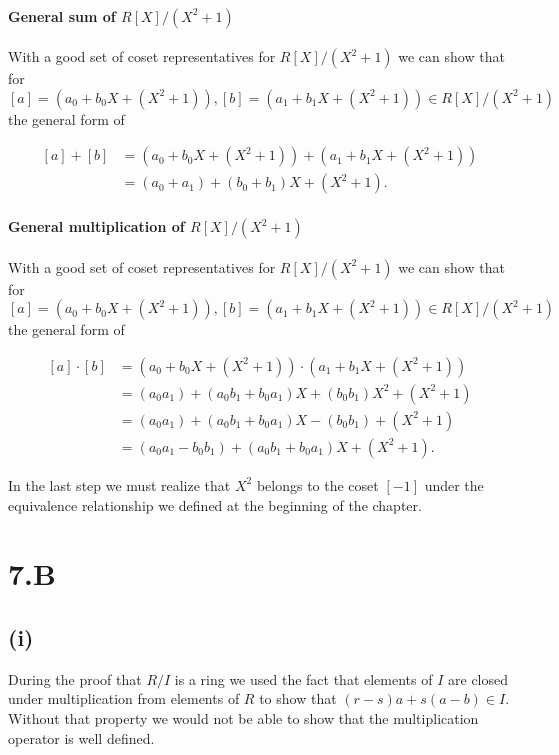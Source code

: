 \documentclass{article}
\begin{document}
    \paragraph{General sum of $R[X]/(X^2 + 1)$} With a good set of coset representatives for $R[X]/(X^2 + 1)$ we can show that for $[a] = (a_0 + b_0X + (X^2 + 1)),  [b] = (a_1 + b_1X + (X^2 + 1)) \in R[X]/(X^2 + 1)$ the general form of 

    \[
        \begin{split}
          [a] + [b] &= (a_0 + b_0X + (X^2 + 1)) +  (a_1 + b_1X + (X^2 + 1))\\
          &= (a_0+a_1) + (b_0 + b_1)X + (X^2 + 1).
        \end{split}
    \]


    \paragraph{General multiplication of $R[X]/(X^2 + 1)$} With a good set of coset representatives for $R[X]/(X^2 + 1)$ we can show that for $[a] = (a_0 + b_0X + (X^2 + 1)),  [b] = (a_1 + b_1X + (X^2 + 1)) \in R[X]/(X^2 + 1)$ the general form of 

    \[
        \begin{split}
          [a] \cdot [b] &= (a_0 + b_0X + (X^2 + 1)) \cdot  (a_1 + b_1X + (X^2 + 1))\\
          &= (a_0a_1) + (a_0b_1 + b_0a_1)X + (b_0b_1)X^2 + (X^2 + 1)\\
          &= (a_0a_1) + (a_0b_1 + b_0a_1)X - (b_0b_1) + (X^2 + 1)\\
          &= (a_0a_1 - b_0b_1) + (a_0b_1 + b_0a_1)X + (X^2 + 1).
        \end{split}
    \]

    In the last step we must realize that $X^2$ belongs to the coset $[-1]$ under the equivalence relationship we defined at the beginning of the chapter.

  \section*{7.B}
    \subsection*{(i)}
      During the proof that $R/I$ is a ring we used the fact that elements of $I$ are closed under multiplication from elements of $R$ to show that $(r-s)a + s(a-b) \in I$. Without that property we would not be able to show that the multiplication operator is well defined.
\end{document}
